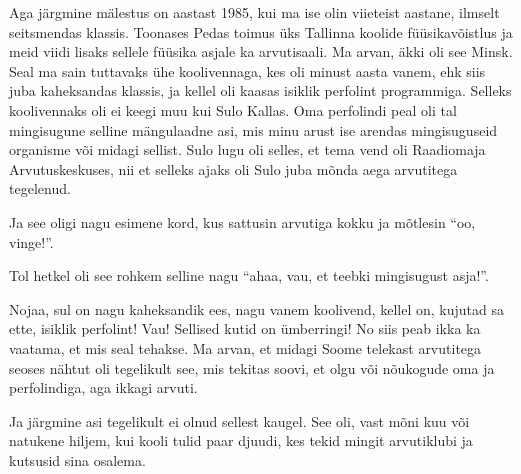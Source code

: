 Aga järgmine mälestus on  aastast 1985, kui ma ise olin viieteist aastane, 
ilmselt seitsmendas klassis. Toonases Pedas toimus üks Tallinna koolide 
füüsikavõistlus ja meid viidi lisaks sellele füüsika asjale ka arvutisaali. Ma 
arvan, äkki oli see  Minsk. Seal ma sain tuttavaks ühe 
koolivennaga, kes oli minust aasta vanem, ehk siis juba kaheksandas klassis, ja 
kellel oli kaasas isiklik perfolint programmiga. Selleks koolivennaks oli ei 
keegi muu kui Sulo Kallas. Oma perfolindi peal oli tal 
mingisugune selline mängulaadne asi, mis minu arust ise  arendas mingisuguseid 
organisme või midagi sellist. 
Sulo lugu  oli selles, et tema vend oli Raadiomaja 
Arvutuskeskuses, nii et selleks ajaks oli Sulo 
juba mõnda aega arvutitega tegelenud. 

Ja see oligi nagu esimene kord, kus sattusin arvutiga kokku ja mõtlesin 
\enquote{oo, vinge!}.


Tol hetkel  oli see rohkem selline nagu \enquote{ahaa, vau, et teebki 
mingisugust asja!}. 


Nojaa, sul on nagu kaheksandik ees,  nagu vanem koolivend, kellel on,  kujutad 
sa ette, isiklik perfolint! Vau! Sellised kutid on ümberringi! No siis peab 
ikka ka vaatama, et mis seal tehakse. Ma arvan, et  midagi Soome telekast 
arvutitega seoses nähtut oli tegelikult see, mis tekitas soovi, et olgu või 
nõukogude oma ja perfolindiga, aga ikkagi arvuti. 

Ja järgmine asi tegelikult ei olnud sellest kaugel. See oli, vast mõni kuu või 
natukene hiljem, kui kooli tulid paar djuudi, kes tekid mingit arvutiklubi ja 
kutsusid sina osalema. 


